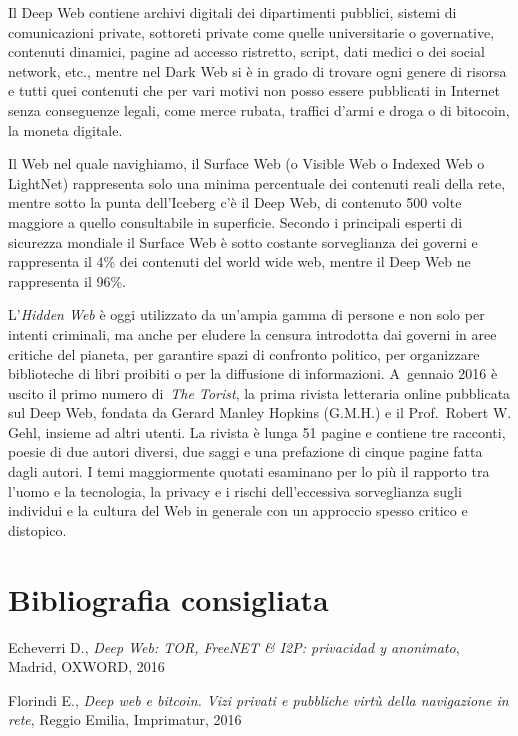 \documentclass[
  b5paper,
  twoside,
  12pt,
  chapterprefix=false,
  bibliography=totocnumbered,
  parskip=false]{scrbook}
\begin{document}
Il Deep Web contiene archivi digitali dei dipartimenti pubblici, sistemi
di comunicazioni private, sottoreti private come quelle universitarie o
governative, contenuti dinamici, pagine ad accesso ristretto, script,
dati medici o dei social network, etc., mentre nel Dark Web si è in
grado di trovare ogni genere di risorsa e tutti quei contenuti che per
vari motivi non posso essere pubblicati in Internet senza conseguenze
legali, come merce rubata, traffici d'armi e droga o di bitocoin, la
moneta digitale.

Il Web nel quale navighiamo, il Surface Web (o Visible Web o Indexed Web
o LightNet) rappresenta solo una minima percentuale dei contenuti reali
della rete, mentre sotto la punta dell'Iceberg c'è il Deep Web, di
contenuto 500 volte maggiore a quello consultabile in superficie.
Secondo i principali esperti di sicurezza mondiale il Surface Web è
sotto costante sorveglianza dei governi e rappresenta il 4\% dei
contenuti del world wide web, mentre il Deep Web ne rappresenta il 96\%.

L'\emph{Hidden Web} è oggi utilizzato da un'ampia gamma di persone e non solo
per intenti criminali, ma anche per eludere la censura introdotta dai
governi in aree critiche del pianeta, per garantire spazi di confronto
politico, per organizzare biblioteche di libri proibiti o per la
diffusione di informazioni. A~gennaio 2016 è uscito il primo numero
di~\emph{The Torist}, la prima rivista letteraria online pubblicata sul Deep
Web, fondata da Gerard Manley Hopkins (G.M.H.) e il Prof.~Robert W.
Gehl, insieme ad altri utenti. La rivista è lunga 51 pagine e contiene
tre racconti, poesie di due autori diversi, due saggi e una prefazione
di cinque pagine fatta dagli autori. I temi maggiormente quotati
esaminano per lo più il rapporto tra l'uomo e la tecnologia, la privacy
e i rischi dell'eccessiva sorveglianza sugli individui e la cultura del
Web in generale con un approccio spesso critico e distopico.

\hypertarget{bibliografia-consigliata-11}{%
\section*{Bibliografia consigliata}\label{bibliografia-consigliata-11}}

Echeverri D., \emph{Deep Web: TOR, FreeNET \& I2P: privacidad y anonimato},
Madrid, OXWORD, 2016

Florindi E., \emph{Deep web e bitcoin. Vizi privati e pubbliche virtù della
navigazione in rete}, Reggio Emilia, Imprimatur, 2016
\end{document}
